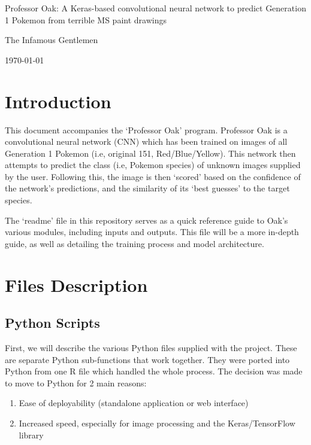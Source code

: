 \documentclass[onecolumn]{article}
\begin{document}
\begin{titlepage}
	{\huge Professor Oak: A Keras-based convolutional neural network to predict Generation 1 Pokemon from terrible MS paint drawings
\par}
	\vspace{1cm}
	{\Large The Infamous Gentlemen \par}
	\vspace{1cm}
	{\large \today\par}
	
\end{titlepage}

\section*{Introduction}

This document accompanies the `Professor Oak' program. Professor Oak is a convolutional neural network (CNN) which has been trained on images of all Generation 1 Pokemon (i.e, original 151, Red/Blue/Yellow). This network then attempts to predict the class (i.e, Pokemon species) of unknown images supplied by the user. Following this, the image is then `scored' based on the confidence of the network's predictions, and the similarity of its `best guesses' to the target species.

The `readme' file in this repository serves as a quick reference guide to Oak's various modules, including inputs and outputs. This file will be a more in-depth guide, as well as detailing the training process and model architecture.

\section*{Files Description}


\subsection*{Python Scripts}

First, we will describe the various Python files supplied with the project. These are separate Python sub-functions that work together. They were ported into Python from one R file which handled the whole process. The decision was made to move to Python for 2 main reasons:

\begin{enumerate}
\item Ease of deployability (standalone application or web interface)
\item Increased speed, especially for image processing and the Keras/TensorFlow library
\end{enumerate}
\end{document}
